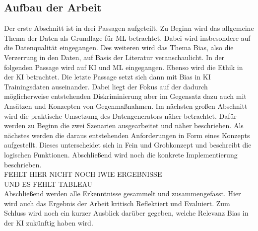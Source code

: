 \begin{onehalfspace}
        \section{Aufbau der Arbeit}
        \label{subsec:aufbau der arbeit}
        Der erste Abschnitt ist in drei Passagen aufgeteilt. Zu Beginn wird das allgemeine Thema der Daten als Grundlage für \ac*{ML} betrachtet. Dabei wird insbesondere auf die Datenqualität eingegangen. Des weiteren wird das Thema Bias, also die Verzerrung in den Daten, auf Basis der Literatur veranschaulicht. In der folgenden Passage wird auf \ac*{KI} und \ac*{ML} eingegangen. Ebenso wird die Ethik in der \ac*{KI} betrachtet. Die letzte Passage setzt sich dann mit Bias in \ac*{KI} Trainingsdaten auseinander. Dabei liegt der Fokus auf der dadurch möglicherweise entstehenden Diskriminierung aber im Gegensatz dazu auch mit Ansätzen und Konzepten von Gegenmaßnahmen.
        Im nächsten großen Abschnitt wird die praktische Umsetzung des Datengenerators näher betrachtet. Dafür werden zu Beginn die zwei Szenarien ausgearbeitet und näher beschrieben. Als nächstes werden die daraus entstehenden Anforderungen in Form eines Konzepts aufgestellt. Dieses unterscheidet sich in Fein und Grobkonzept und beschreibt die logischen Funktionen. Abschließend wird noch die konkrete Implementierung beschrieben.
        \\
        FEHLT HIER NICHT NOCH IWIE ERGEBNISSE \\
        UND ES FEHLT TABLEAU
        \\
        Abschließend werden alle Erkenntnisse gesammelt und zusammengefasst. Hier wird auch das Ergebnis der Arbeit kritisch Reflektiert und Evaluiert. Zum Schluss wird noch ein kurzer Ausblick darüber gegeben, welche Relevanz Bias in der \ac*{KI} zukünftig haben wird. 

        

        \newpage

    \end{onehalfspace}